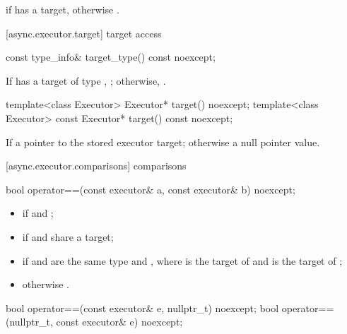 \begin{itemdescr}
\pnum
\returns {} if  has a target, otherwise .
\end{itemdescr}



[async.executor.target]{ target access}

\begin{itemdecl}
const type_info& target_type() const noexcept;
\end{itemdecl}

\begin{itemdescr}
\pnum
\returns If  has a target of type , ; otherwise, .
\end{itemdescr}

\begin{itemdecl}
template<class Executor> Executor* target() noexcept;
template<class Executor> const Executor* target() const noexcept;
\end{itemdecl}

\begin{itemdescr}
\pnum
\returns If  a pointer to the stored executor target; otherwise a null pointer value.
\end{itemdescr}



[async.executor.comparisons]{ comparisons}

\begin{itemdecl}
bool operator==(const executor& a, const executor& b) noexcept;
\end{itemdecl}

\begin{itemdescr}
\pnum
\returns 
\begin{itemize}
\item
{} if  and ;
\item
{} if  and  share a target;
\item
{} if  and  are the same type and , where  is the target of  and  is the target of ;
\item
 otherwise .
\end{itemize}
\end{itemdescr}

\begin{itemdecl}
bool operator==(const executor& e, nullptr_t) noexcept;
bool operator==(nullptr_t, const executor& e) noexcept;
\end{itemdecl}

